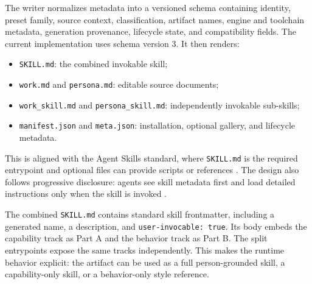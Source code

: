 \documentclass{article}
\begin{document}
The writer normalizes metadata into a versioned schema containing identity, preset family, source context, classification, artifact names, engine and toolchain metadata, generation provenance, lifecycle state, and compatibility fields. The current implementation uses schema version 3. It then renders:
\begin{itemize}
  \item \texttt{SKILL.md}: the combined invokable skill;
  \item \texttt{work.md} and \texttt{persona.md}: editable source documents;
  \item \texttt{work\_skill.md} and \texttt{persona\_skill.md}: independently invokable sub-skills;
  \item \texttt{manifest.json} and \texttt{meta.json}: installation, optional gallery, and lifecycle metadata.
\end{itemize}

This is aligned with the Agent Skills standard, where \texttt{SKILL.md} is the required entrypoint and optional files can provide scripts or references \citep{agentskillsspec2026}. The design also follows progressive disclosure: agents see skill metadata first and load detailed instructions only when the skill is invoked \citep{agentskills2026,claudeskills2026}.

The combined \texttt{SKILL.md} contains standard skill frontmatter, including a generated name, a description, and \texttt{user-invocable: true}. Its body embeds the capability track as Part A and the behavior track as Part B. The split entrypoints expose the same tracks independently. This makes the runtime behavior explicit: the artifact can be used as a full person-grounded skill, a capability-only skill, or a behavior-only style reference.
\end{document}
